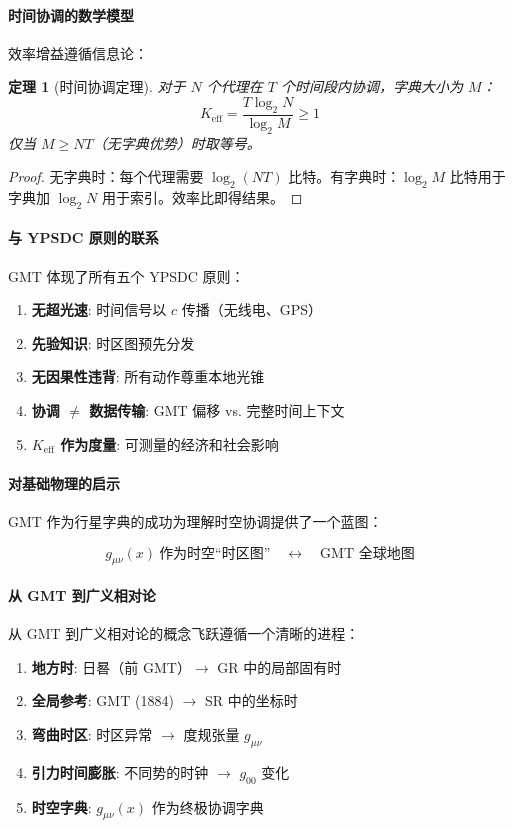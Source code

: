 \documentclass[11pt,a4paper]{article}
\newtheorem{theorem}{定理}
\begin{document}
	\paragraph{时间协调的数学模型}
	效率增益遵循信息论：
	
	\begin{theorem}[时间协调定理]
		对于 $N$ 个代理在 $T$ 个时间段内协调，字典大小为 $M$：
		\begin{equation}
			K_{\mathrm{eff}} = \frac{T \log_2 N}{\log_2 M} \geq 1
		\end{equation}
		仅当 $M \geq NT$（无字典优势）时取等号。
	\end{theorem}
	
	\begin{proof}
		无字典时：每个代理需要 $\log_2(NT)$ 比特。有字典时：$\log_2 M$ 比特用于字典加 $\log_2 N$ 用于索引。效率比即得结果。
	\end{proof}
	
	\paragraph{与 YPSDC 原则的联系}
	GMT 体现了所有五个 YPSDC 原则：
	\begin{enumerate}
		\item \textbf{无超光速}: 时间信号以 $c$ 传播（无线电、GPS）
		\item \textbf{先验知识}: 时区图预先分发
		\item \textbf{无因果性违背}: 所有动作尊重本地光锥
		\item \textbf{协调 $\neq$ 数据传输}: GMT 偏移 vs. 完整时间上下文
		\item \textbf{$K_{\mathrm{eff}}$ 作为度量}: 可测量的经济和社会影响
	\end{enumerate}
	
	\paragraph{对基础物理的启示}
	GMT 作为行星字典的成功为理解时空协调提供了一个蓝图：
	
	\begin{equation}
		g_{\mu\nu}(x) \ \text{作为时空“时区图”} \quad \leftrightarrow \quad \text{GMT 全球地图}
	\end{equation}
	
	\paragraph{从 GMT 到广义相对论}
	从 GMT 到广义相对论的概念飞跃遵循一个清晰的进程：
	\begin{enumerate}
		\item \textbf{地方时}: 日晷（前 GMT）$\rightarrow$ GR 中的局部固有时
		\item \textbf{全局参考}: GMT (1884) $\rightarrow$ SR 中的坐标时
		\item \textbf{弯曲时区}: 时区异常 $\rightarrow$ 度规张量 $g_{\mu\nu}$
		\item \textbf{引力时间膨胀}: 不同势的时钟 $\rightarrow$ $g_{00}$ 变化
		\item \textbf{时空字典}: $g_{\mu\nu}(x)$ 作为终极协调字典
	\end{enumerate}
	
\end{document}
